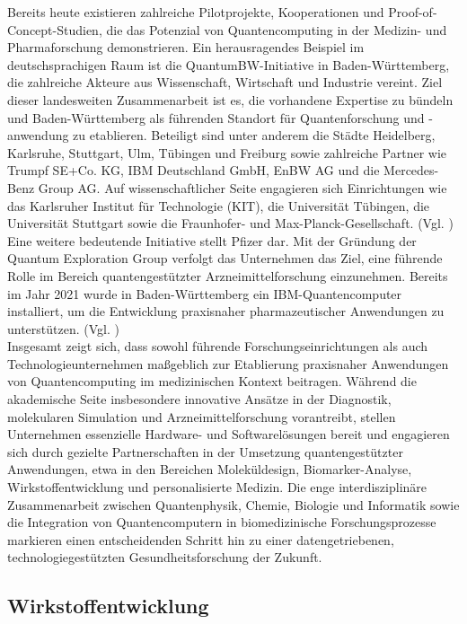 Bereits heute existieren zahlreiche Pilotprojekte, Kooperationen und Proof-of-Concept-Studien, die das Potenzial von Quantencomputing in der Medizin- und Pharmaforschung demonstrieren. Ein herausragendes Beispiel im deutschsprachigen Raum ist die QuantumBW-Initiative in Baden-Württemberg, die zahlreiche Akteure aus Wissenschaft, Wirtschaft und Industrie vereint. Ziel dieser landesweiten Zusammenarbeit ist es, die vorhandene Expertise zu bündeln und Baden-Württemberg als führenden Standort für Quantenforschung und -anwendung zu etablieren. Beteiligt sind unter anderem die Städte Heidelberg, Karlsruhe, Stuttgart, Ulm, Tübingen und Freiburg sowie zahlreiche Partner wie Trumpf SE+Co. KG, IBM Deutschland GmbH, EnBW AG und die Mercedes-Benz Group AG. Auf wissenschaftlicher Seite engagieren sich Einrichtungen wie das Karlsruher Institut für Technologie (KIT), die Universität Tübingen, die Universität Stuttgart sowie die Fraunhofer- und Max-Planck-Gesellschaft. (Vgl. \cite{noauthor_partner_nodate})\\

Eine weitere bedeutende Initiative stellt Pfizer dar. Mit der Gründung der Quantum Exploration Group verfolgt das Unternehmen das Ziel, eine führende Rolle im Bereich quantengestützter Arzneimittelforschung einzunehmen. Bereits im Jahr 2021 wurde in Baden-Württemberg ein IBM-Quantencomputer installiert, um die Entwicklung praxisnaher pharmazeutischer Anwendungen zu unterstützen. (Vgl. \cite{papalitsas_quantum_2025})\\

Insgesamt zeigt sich, dass sowohl führende Forschungseinrichtungen als auch Technologieunternehmen maßgeblich zur Etablierung praxisnaher Anwendungen von Quantencomputing im medizinischen Kontext beitragen. Während die akademische Seite insbesondere innovative Ansätze in der Diagnostik, molekularen Simulation und Arzneimittelforschung vorantreibt, stellen Unternehmen essenzielle Hardware- und Softwarelösungen bereit und engagieren sich durch gezielte Partnerschaften in der Umsetzung quantengestützter Anwendungen, etwa in den Bereichen Moleküldesign, Biomarker-Analyse, Wirkstoffentwicklung und personalisierte Medizin. Die enge interdisziplinäre Zusammenarbeit zwischen Quantenphysik, Chemie, Biologie und Informatik sowie die Integration von Quantencomputern in biomedizinische Forschungsprozesse markieren einen entscheidenden Schritt hin zu einer datengetriebenen, technologiegestützten Gesundheitsforschung der Zukunft.


\subsection*{Wirkstoffentwicklung}

